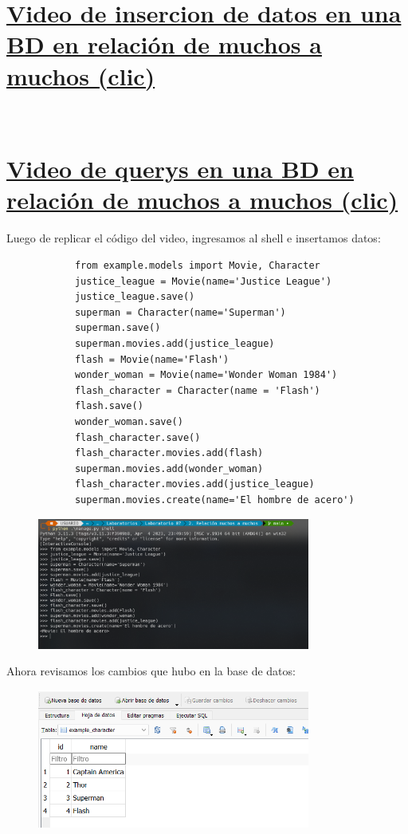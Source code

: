 \documentclass{article}
\begin{document}
\begin{enumerate}
		\section{\normalfont\small\href{https://drive.google.com/file/d/1Jpb2xC8gT3R0ZPsn_H1gWBFag8vacoac/view}{Video de insercion de datos en una BD en relación de muchos a muchos (clic)}}\\
		\section{\normalfont\small\href{https://drive.google.com/file/d/16Z8nzSkUnn7K6iTZ4VvAveV37piMwCM2/view}{Video de querys en una BD en relación de muchos a muchos (clic)}} 
		
		Luego de replicar el código del video, ingresamos al shell e insertamos datos:
		\begin{lstlisting}
			from example.models import Movie, Character
			justice_league = Movie(name='Justice League')
			justice_league.save()
			superman = Character(name='Superman')
			superman.save()
			superman.movies.add(justice_league)
			flash = Movie(name='Flash')
			wonder_woman = Movie(name='Wonder Woman 1984')
			flash_character = Character(name = 'Flash')
			flash.save()
			wonder_woman.save()
			flash_character.save()
			flash_character.movies.add(flash)
			superman.movies.add(wonder_woman)
			flash_character.movies.add(justice_league)
			superman.movies.create(name='El hombre de acero')
		\end{lstlisting}
		\begin{figure}[H]
			\centering
			\includegraphics[width=0.8\textwidth,keepaspectratio]{img/Ejercicio2/insert.png}
		\end{figure}
		Ahora revisamos los cambios que hubo en la base de datos:
		\begin{figure}[H]
			\centering
			\includegraphics[width=0.8\textwidth,keepaspectratio]{img/Ejercicio2/bd-character.png}

\end{figure}
\end{enumerate}
\end{document}
